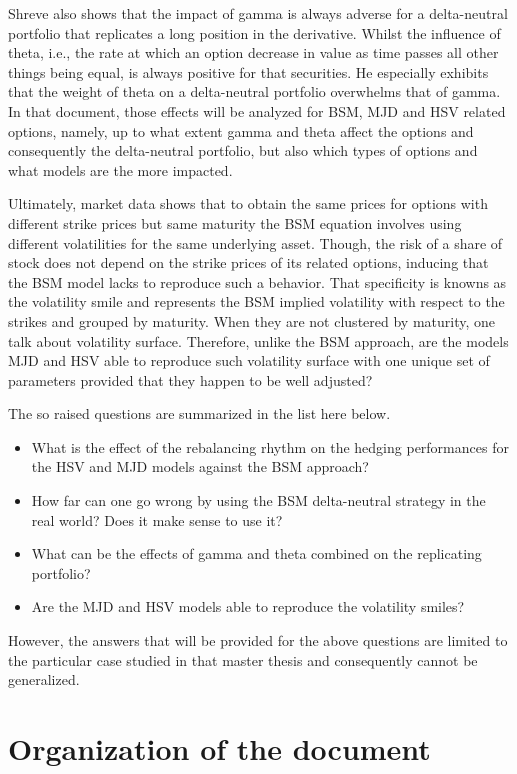 \documentclass[a4paper, 12pt]{report}
\begin{document}
Shreve also shows that the impact of gamma is always adverse for a delta-neutral portfolio that replicates a long position in the derivative. 
Whilst the influence of theta, i.e., the rate at which an option decrease in value as time passes all other things being equal, is always positive for that securities.
He especially exhibits that the weight of theta on a delta-neutral portfolio overwhelms that of gamma. 
In that document, those effects will be analyzed for BSM, MJD and HSV related options, namely, up to what extent gamma and theta affect the options and consequently the delta-neutral portfolio, but also which types of options and what models are the more impacted.

Ultimately, market data shows that to obtain the same prices for options with different strike prices but same maturity the BSM equation involves using different volatilities for the same underlying asset.
Though, the risk of a share of stock does not depend on the strike prices of its related options, inducing that the BSM model lacks to reproduce such a behavior.
That specificity is knowns as the volatility smile and represents the BSM implied volatility with respect to the strikes and grouped by maturity.
When they are not clustered by maturity, one talk about volatility surface.
Therefore, unlike the BSM approach, are the models MJD and HSV able to reproduce such volatility surface with one unique set of parameters provided that they happen to be well adjusted?

The so raised questions are summarized in the list here below.

\begin{itemize}
\item What is the effect of the rebalancing rhythm on the hedging performances for the HSV and MJD models against the BSM approach? 
\item How far can one go wrong by using the BSM delta-neutral strategy in the real world? Does it make sense to use it?
\item What can be the effects of gamma and theta combined on the replicating portfolio?
\item Are the MJD and HSV models able to reproduce the volatility smiles? 
\end{itemize}

However, the answers that will be provided for the above questions are limited to the particular case studied in that master thesis and consequently cannot be generalized.


\section{Organization of the document}
\label{sec:introduction:organization}
\end{document}
